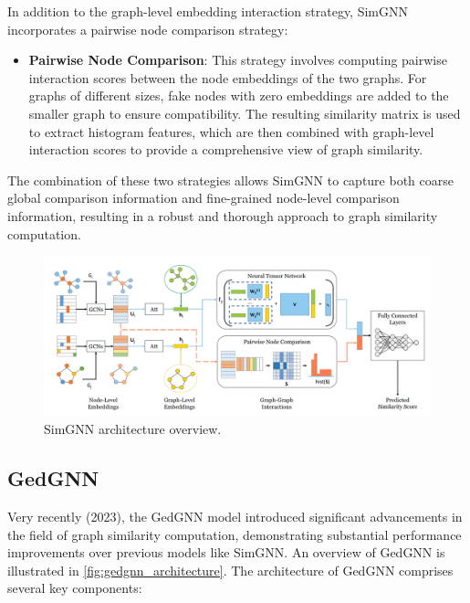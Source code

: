 \documentclass[../Thesis.tex]{subfiles}
\begin{document}
	In addition to the graph-level embedding interaction strategy, SimGNN incorporates a pairwise node comparison strategy:
	
	\begin{itemize}
		\item \textbf{Pairwise Node Comparison}: This strategy involves computing pairwise interaction scores between the node embeddings of the two graphs. For graphs of different sizes, fake nodes with zero embeddings are added to the smaller graph to ensure compatibility. The resulting similarity matrix is used to extract histogram features, which are then combined with graph-level interaction scores to provide a comprehensive view of graph similarity.
	\end{itemize}
	
	The combination of these two strategies allows SimGNN to capture both coarse global comparison information and fine-grained node-level comparison information, resulting in a robust and thorough approach to graph similarity computation.
	
	\begin{figure}[H]
		\centering
		\includegraphics[width=\textwidth]{Images/simgnn_architecture.png}
		\caption{SimGNN architecture overview.}
		\label{fig:simgnn_architecture}
	\end{figure}
	
	\subsection{GedGNN}
	
	Very recently (2023), the GedGNN \cite{computing_graph_edit_distance_via_neural_graph_matching} model introduced significant advancements in the field of graph similarity computation, demonstrating substantial performance improvements over previous models like SimGNN. An overview of GedGNN is illustrated in \autoref{fig:gedgnn_architecture}. The architecture of GedGNN comprises several key components:
	
\end{document}

